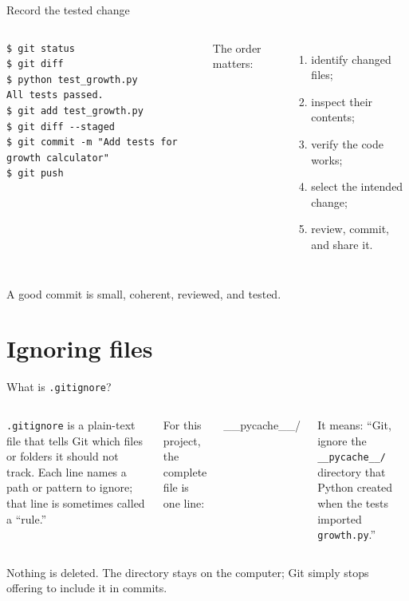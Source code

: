 \documentclass[aspectratio=169,11pt]{beamer}
\begin{document}
\begin{frame}[fragile]{Record the tested change}
\begin{columns}[T,onlytextwidth]
\begin{lstlisting}[style=terminal]
$ git status
$ git diff
$ python test_growth.py
All tests passed.
$ git add test_growth.py
$ git diff --staged
$ git commit -m "Add tests for growth calculator"
$ git push
\end{lstlisting}

  The order matters:
  \begin{enumerate}
    \item identify changed files;
    \item inspect their contents;
    \item verify the code works;
    \item select the intended change;
    \item review, commit, and share it.
  \end{enumerate}
\end{columns}

\vspace{0.7em}
A good commit is small, coherent, reviewed, and tested.
\end{frame}


\section{Ignoring files}

\begin{frame}{What is \texttt{.gitignore}?}
\begin{columns}[T,onlytextwidth]
  \texttt{.gitignore} is a plain-text file that tells Git which files or folders
  it should not track. Each line names a path or pattern to ignore; that line is
  sometimes called a ``rule.''

  For this project, the complete file is one line:
  \vspace{0.5em}

  {\ttfamily\large \_\_pycache\_\_/}

  \vspace{0.6em}
  It means: ``Git, ignore the \texttt{\_\_pycache\_\_/} directory that Python
  created when the tests imported \texttt{growth.py}.''
\end{columns}

\vspace{1em}
Nothing is deleted. The directory stays on the computer; Git simply stops
offering to include it in commits.
\end{frame}
\end{document}
